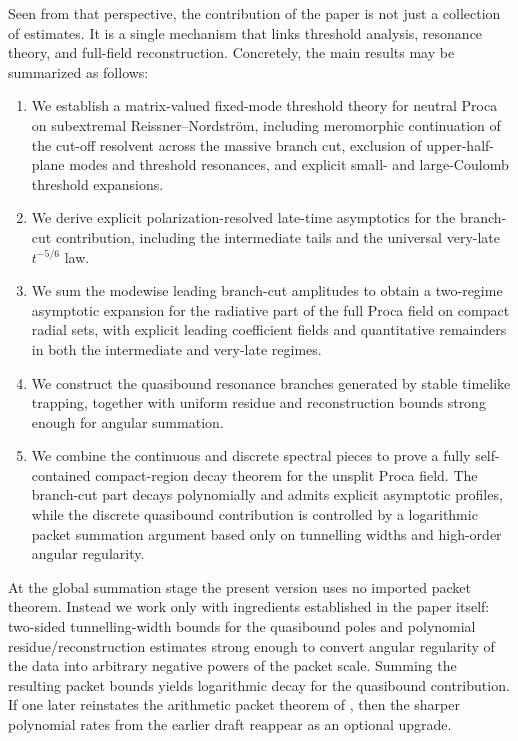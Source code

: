 \documentclass[12pt]{article}
\numberwithin{equation}{section}
\theoremstyle{plain}
\theoremstyle{definition}
\theoremstyle{remark}
\begin{document}
Seen from that perspective, the contribution of the paper is not just a collection of estimates.  It is a single mechanism that links threshold analysis, resonance theory, and full-field reconstruction.  Concretely, the main results may be summarized as follows:
\begin{enumerate}[label=\textnormal{(\roman*)}]
   \item We establish a matrix-valued fixed-mode threshold theory for neutral Proca on subextremal Reissner--Nordstr\"om, including meromorphic continuation of the cut-off resolvent across the massive branch cut, exclusion of upper-half-plane modes and threshold resonances, and explicit small- and large-Coulomb threshold expansions.
   \item We derive explicit polarization-resolved late-time asymptotics for the branch-cut contribution, including the intermediate tails and the universal very-late $t^{-5/6}$ law.
   \item We sum the modewise leading branch-cut amplitudes to obtain a two-regime asymptotic expansion for the radiative part of the full Proca field on compact radial sets, with explicit leading coefficient fields and quantitative remainders in both the intermediate and very-late regimes.
   \item We construct the quasibound resonance branches generated by stable timelike trapping, together with uniform residue and reconstruction bounds strong enough for angular summation.
   \item We combine the continuous and discrete spectral pieces to prove a fully self-contained compact-region decay theorem for the unsplit Proca field.  The branch-cut part decays polynomially and admits explicit asymptotic profiles, while the discrete quasibound contribution is controlled by a logarithmic packet summation argument based only on tunnelling widths and high-order angular regularity.
\end{enumerate}

At the global summation stage the present version uses no imported packet theorem.  Instead we work only with ingredients established in the paper itself: two-sided tunnelling-width bounds for the quasibound poles and polynomial residue/reconstruction estimates strong enough to convert angular regularity of the data into arbitrary negative powers of the packet scale.  Summing the resulting packet bounds yields logarithmic decay for the quasibound contribution.  If one later reinstates the arithmetic packet theorem of \cite{ShlapentokhRothmanVanDeMoortel2026}, then the sharper polynomial rates from the earlier draft reappear as an optional upgrade.
\end{document}
